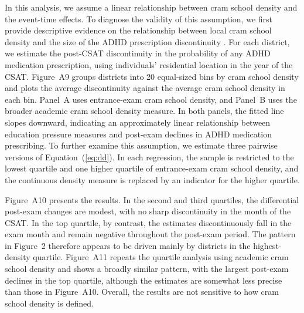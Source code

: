 \documentclass[12pt]{article}
\begin{document}
In this analysis, we assume a linear relationship between cram school density and the event-time effects. To diagnose the validity of this assumption, we first provide descriptive evidence on the relationship between local cram school density and the size of the ADHD prescription discontinuity \citep{callaway2024}. For each district, we estimate the post-CSAT discontinuity in the probability of any ADHD medication prescription, using individuals' residential location in the year of the CSAT. Figure~A9 groups districts into 20 equal-sized bins by cram school density and plots the average discontinuity against the average cram school density in each bin. Panel~A uses entrance-exam cram school density, and Panel~B uses the broader academic cram school density measure. In both panels, the fitted line slopes downward, indicating an approximately linear relationship between education pressure measures and post-exam declines in ADHD medication prescribing. To further examine this assumption, we estimate three pairwise versions of Equation~(\ref{eq:dd}). In each regression, the sample is restricted to the lowest quartile and one higher quartile of entrance-exam cram school density, and the continuous density measure is replaced by an indicator for the higher quartile.

Figure~A10 presents the results. In the second and third quartiles, the differential post-exam changes are modest, with no sharp discontinuity in the month of the CSAT. In the top quartile, by contrast, the estimates discontinuously fall in the exam month and remain negative throughout the post-exam period. The pattern in Figure~2 therefore appears to be driven mainly by districts in the highest-density quartile. Figure~A11 repeats the quartile analysis using academic cram school density and shows a broadly similar pattern, with the largest post-exam declines in the top quartile, although the estimates are somewhat less precise than those in Figure~A10. Overall, the results are not sensitive to how cram school density is defined.
\end{document}
